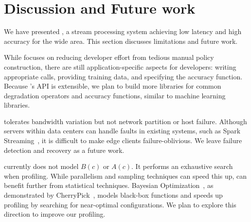 \section{Discussion and Future work}
\label{sec:discussion}

We have presented \sysname{}, a stream processing system achieving low latency
and high accuracy for the wide area. This section discusses limitations and
future work.

 While \sysname{} focuses on reducing developer
effort from tedious manual policy construction, there are still
application-specific aspects for developers: writing appropriate \maybe{} calls,
providing training data, and specifying the accuracy function. Because
\sysname{}'s API is extensible, we plan to build more libraries for common
degradation operators and accuracy functions, similar to machine learning
libraries.

 \sysname{} tolerates bandwidth variation
but not network partition or host failure. Although servers within data centers
can handle faults in existing systems, such as Spark
Streaming~\cite{zaharia2013discretized}, it is difficult to make edge clients
failure-oblivious.  We leave failure detection and recovery as a future work.

 \sysname{} currently does not model $B(c)$ or
$A(c)$. It performs an exhaustive search when profiling. While parallelism and
sampling techniques can speed this up, \sysname{} can benefit further from
statistical techniques. Bayesian Optimization~\cite{snoek2012practical}, as
demonstrated by CherryPick~\cite{alipourfard2017cherrypick}, models black-box
functions and speeds up profiling by searching for near-optimal
configurations. We plan to explore this direction to improve our profiling.



